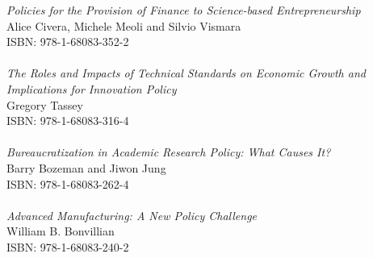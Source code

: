 \vspace{12pt}

\noindent \textit{Policies for the Provision of Finance to Science-based Entrepreneurship}\\
Alice Civera, Michele Meoli and Silvio Vismara\\
ISBN: 978-1-68083-352-2\\
\\
\noindent \textit{The Roles and Impacts of Technical Standards on Economic Growth and Implications for Innovation Policy}\\
Gregory Tassey\\
ISBN: 978-1-68083-316-4\\
\\
\noindent \textit{Bureaucratization in Academic Research Policy: What Causes It?}\\
Barry Bozeman and Jiwon Jung\\
ISBN: 978-1-68083-262-4\\
\\
\noindent \textit{Advanced Manufacturing: A New Policy Challenge}\\
William B. Bonvillian\\
ISBN: 978-1-68083-240-2